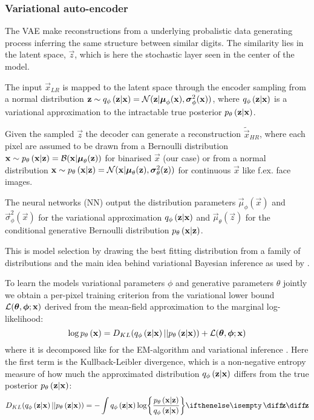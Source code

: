 \subsubsection{Variational auto-encoder}
\label{ssub:vae}
The VAE make reconstructions from a underlying probalistic data generating process inferring the same structure between similar digits. The similarity lies in the latent space, $\vec{z}$, which is here the stochastic layer seen in the center of the model. 

The input $\vec{x}_{LR}$ is mapped to the latent space through the encoder sampling from a normal distribution
$\bm{\mathrm{z}} \sim q_{\phi}\left(\bm{\mathrm{z}}|\bm{\mathrm{x}}\right) = \mathcal{N}( \bm{\mathrm{z}}|\bm{\mathrm{\mu}}_\phi(\bm{\mathrm{x}}),\bm{\mathrm{\sigma}}^2_\phi(\bm{\mathrm{x}}))$, where $q_{\phi}\left(\bm{\mathrm{z}}|\bm{\mathrm{x}}\right)$ is a variational approximation to the intractable true posterior $p_{\theta}\left(\bm{\mathrm{z}}|\bm{\mathrm{x}}\right)$. 

Given the sampled $\vec{z}$ the decoder can generate a reconstruction $\tilde{\vec{x}}_{HR}$, where each pixel are assumed to be drawn from a Bernoulli distribution $\bm{\mathrm{x}} \sim p_{\theta}\left(\bm{\mathrm{x}}|\bm{\mathrm{z}}\right)=\mathcal{B}( \bm{\mathrm{x}}|\bm{\mathrm{\mu}}_\theta(\bm{\mathrm{z}}))$ for binarised $\vec{x}$ (our case) or from a normal distribution $\bm{\mathrm{x}} \sim p_{\theta}\left(\bm{\mathrm{x}}|\bm{\mathrm{z}}\right)=\mathcal{N}( \bm{\mathrm{x}}|\bm{\mathrm{\mu}}_\theta(\bm{\mathrm{z}}),\bm{\mathrm{\sigma}}^2_\theta(\bm{\mathrm{z}}))$ for continuous $\vec{x}$ like f.ex. face images.

The neural networks (NN) output the distribution parameters $\vec{\mu}_\phi(\vec{x})$ and $\vec{\sigma}^2_\phi(\vec{x})$ for the variational approximation $q_{\phi}\left(\bm{\mathrm{z}}|\bm{\mathrm{x}}\right)$ and $\vec{\mu}_\theta(\vec{z})$ for the conditional generative Bernoulli distribution $p_{\theta}\left(\bm{\mathrm{x}}|\bm{\mathrm{z}}\right)$. 

This is model selection by drawing the best fitting distribution from a family of distributions and the main idea behind variational Bayesian inference as used by \cite{Kingma2013}. 
 
To learn the models variational parameters $\phi$ and generative parameters $\theta$ jointly we obtain a per-pixel training criterion from the variational lower bound $\mathcal{L}(\bm{\mathrm{\theta}},\bm{\mathrm{\phi}};\bm{\mathrm{x}})$ derived from the mean-field approximation to the marginal log-likelihood:
\begin{equation}
	\log p_{\theta}\left(\bm{\mathrm{x}}\right) = D_{KL}( q_{\phi}\left(\bm{\mathrm{z}}|\bm{\mathrm{x}}\right)||p_{\theta}\left(\bm{\mathrm{z}}|\bm{\mathrm{x}}\right)) + \mathcal{L}(\bm{\mathrm{\theta}},\bm{\mathrm{\phi}};\bm{\mathrm{x}})
\end{equation} 
where it is decomposed like for the EM-algorithm and variational inference \cite[\S10.2]{Bishop2006}. Here the first term is the Kullback-Leibler divergence, which is a non-negative entropy measure of how much the approximated distribution $q_{\phi}\left(\bm{\mathrm{z}}|\bm{\mathrm{x}}\right)$  differs from the true posterior $p_{\theta}\left(\bm{\mathrm{z}}|\bm{\mathrm{x}}\right)$:
\begin{equation}
	D_{KL}\parens{ \enc{\vec{z}|\vec{x}}||\dec{\vec{z}|\vec{x}}} = -\int \enc{\vec{z}|\vec{x}} \log \curlies*{ \frac{\dec{\vec{x}|\vec{z}}}{\enc{\vec{z}|\vec{x}} } } \D{\vec{z}}
\end{equation}

